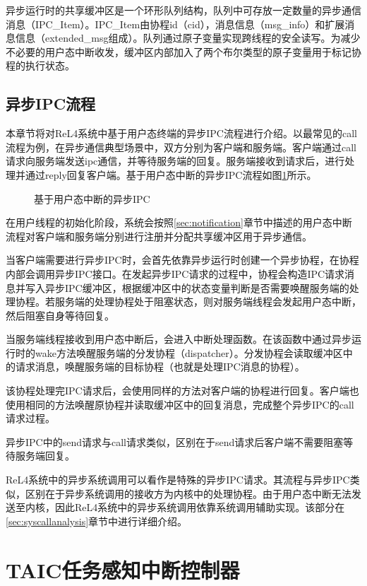 异步运行时的共享缓冲区是一个环形队列结构，队列中可存放一定数量的异步通信消息（IPC\_Item）。IPC\_Item由协程id（cid），消息信息（msg\_info）和扩展消息信息（extended\_msg组成）。队列通过原子变量实现跨线程的安全读写。为减少不必要的用户态中断收发，缓冲区内部加入了两个布尔类型的原子变量用于标记协程的执行状态。

\subsection{异步IPC流程}

本章节将对ReL4系统中基于用户态终端的异步IPC流程进行介绍。以最常见的call流程为例，在异步通信典型场景中，双方分别为客户端和服务端。客户端通过call请求向服务端发送ipc通信，并等待服务端的回复。服务端接收到请求后，进行处理并通过reply回复客户端。基于用户态中断的异步IPC流程如图\ref{asyncipc}所示。

\begin{figure}[htbp]
    \centering
    
    \caption{基于用户态中断的异步IPC}\label{asyncipc}
\end{figure}


在用户线程的初始化阶段，系统会按照\ref{sec:notification}章节中描述的用户态中断流程对客户端和服务端分别进行注册并分配共享缓冲区用于异步通信。

当客户端需要进行异步IPC时，会首先依靠异步运行时创建一个异步协程，在协程内部会调用异步IPC接口。在发起异步IPC请求的过程中，协程会构造IPC请求消息并写入异步IPC缓冲区，根据缓冲区中的状态变量判断是否需要唤醒服务端的处理协程。若服务端的处理协程处于阻塞状态，则对服务端线程会发起用户态中断，然后阻塞自身等待回复。

当服务端线程接收到用户态中断后，会进入中断处理函数。在该函数中通过异步运行时的wake方法唤醒服务端的分发协程（dispatcher）。分发协程会读取缓冲区中的请求消息，唤醒服务端的目标协程（也就是处理IPC消息的协程）。

该协程处理完IPC请求后，会使用同样的方法对客户端的协程进行回复。客户端也使用相同的方法唤醒原协程并读取缓冲区中的回复消息，完成整个异步IPC的call请求过程。

异步IPC中的send请求与call请求类似，区别在于send请求后客户端不需要阻塞等待服务端回复。

ReL4系统中的异步系统调用可以看作是特殊的异步IPC请求。其流程与异步IPC类似，区别在于异步系统调用的接收方为内核中的处理协程。由于用户态中断无法发送至内核，因此ReL4系统中的异步系统调用依靠系统调用辅助实现。该部分在\ref{sec:syscallanalysis}章节中进行详细介绍。

\section{TAIC任务感知中断控制器}\label{sec:taic}

